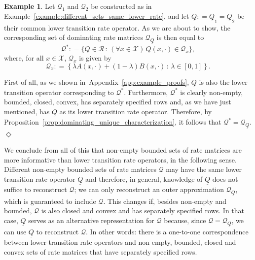 \documentclass[10pt,a4paper]{paper}
\theoremstyle{definition}
\newtheorem{exmp}{Example}
\newcommand{\states}{\mathcal{X}}
\newcommand{\gambles}{\mathcal{L}}
\newcommand{\gamblesX}{\gambles(\states)}
\newcommand{\rateset}{\mathcal{Q}}
\newcommand{\lrate}{\underline{Q}}
\newcommand{\coloneqq}{:\!=}
\newcommand{\exampleend}{\hfill$\Diamond$}
\newcommand{\exampleproofref}{Appendix~\ref{app:example_proofs}}
\begin{document}
\begin{exmp}\label{ex:dominatingset}
Let $\rateset_1$ and $\rateset_2$ be constructed as in Example~\ref{example:different_sets_same_lower_rate}, and let $\lrate\coloneqq\lrate_1=\lrate_2$ be their common lower transition rate operator. As we are about to show, the corresponding set of dominating rate matrices $\rateset_{\lrate}$ is then equal to
\begin{equation}\label{eq:ex:dominatingset:globaldef}
\rateset^* \coloneqq \{Q\in\mathcal{R}\,:\,(\forall x\in\states)\, Q(x,\cdot)\in\rateset_x\},
\end{equation}
where, for all $x\in\states$, $\rateset_x$ is given by
\begin{equation}\label{eq:ex:dominatingset:localdef}
\rateset_x \coloneqq \left\{\lambda A(x,\cdot)+(1-\lambda)B(x,\cdot)\,:\,\lambda\in[0,1]\right\}.
\end{equation}

First of all, as we shown in~\exampleproofref, $\lrate$ is also the lower transition operator corresponding to $\rateset^*$. Furthermore, $\rateset^*$ is clearly non-empty, bounded, closed, convex, has separately specified rows and, as we have just mentioned, has $\lrate$ as its lower transition rate operator. Therefore, by Proposition~\ref{prop:dominating_unique_characterization}, it follows that $\rateset^*=\rateset_{\lrate}$.
\exampleend
\end{exmp}

We conclude from all of this that non-empty bounded sets of rate matrices are more informative than lower transition rate operators, in the following sense. Different non-empty bounded sets of rate matrices $\rateset$ may have the same lower transition rate operator $\lrate$ and therefore, in general, knowledge of $\lrate$ does not suffice to reconstruct $\rateset$; we can only reconstruct an outer approximation $\rateset_{\lrate}$, which is guaranteed to include $\rateset$. This changes if, besides non-empty and bounded, $\rateset$ is also closed and convex and has separately specified rows. In that case, $\lrate$ serves as an alternative representation for $\rateset$ because, since $\rateset=\rateset_{\lrate}$, we can use $\lrate$ to reconstruct $\rateset$. In other words: there is a one-to-one correspondence between lower transition rate operators and non-empty, bounded, closed and convex sets of rate matrices that have separately specified rows.
\end{document}
